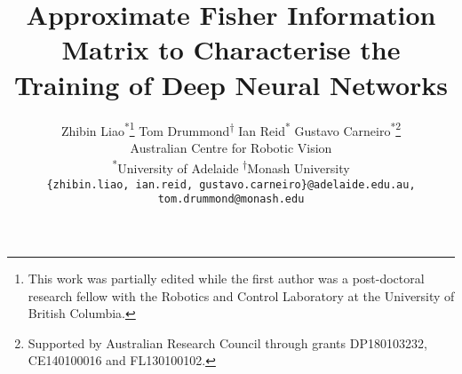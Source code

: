 \documentclass[10pt,journal,compsoc]{IEEEtran}
\newenvironment{DIFnomarkup}{}{}
\begin{document}
\title{Approximate Fisher Information Matrix to Characterise the Training of Deep Neural Networks}

\begin{DIFnomarkup}
\author{Zhibin Liao\textsuperscript{*}\thanks{This work was partially edited while the first author was a post-doctoral research fellow with the Robotics and Control Laboratory at the University of British Columbia.}  \quad Tom Drummond\textsuperscript{$\dagger$}  \quad Ian Reid\textsuperscript{*} \quad Gustavo Carneiro\textsuperscript{*}\thanks{Supported by Australian Research Council through grants DP180103232, CE140100016 and FL130100102.}\\
Australian Centre for Robotic Vision\\
\textsuperscript{*}University of Adelaide \qquad \textsuperscript{$\dagger$}Monash University\\
{\tt\small \{zhibin.liao, ian.reid, gustavo.carneiro\}@adelaide.edu.au, tom.drummond@monash.edu}
}
\end{DIFnomarkup}

\maketitle

\newcommand{\note}[1]{\textcolor{red}{#1}}
\end{document}
